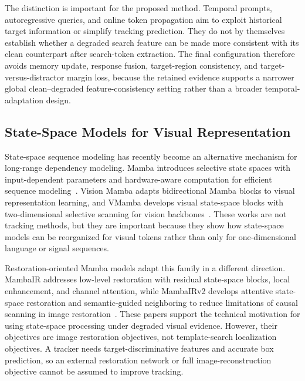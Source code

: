 The distinction is important for the proposed method. Temporal prompts, autoregressive queries, and online token propagation aim to exploit historical target information or simplify tracking prediction. They do not by themselves establish whether a degraded search feature can be made more consistent with its clean counterpart after search-token extraction. The final \method{} configuration therefore avoids memory update, response fusion, target-region consistency, and target-versus-distractor margin loss, because the retained evidence supports a narrower global clean--degraded feature-consistency setting rather than a broader temporal-adaptation design.

\subsection{State-Space Models for Visual Representation}
State-space sequence modeling has recently become an alternative mechanism for long-range dependency modeling. Mamba introduces selective state spaces with input-dependent parameters and hardware-aware computation for efficient sequence modeling~\cite{gu2024mamba}. Vision Mamba adapts bidirectional Mamba blocks to visual representation learning, and VMamba develops visual state-space blocks with two-dimensional selective scanning for vision backbones~\cite{zhu2024visionmamba,liu2024vmamba}. These works are not tracking methods, but they are important because they show how state-space models can be reorganized for visual tokens rather than only for one-dimensional language or signal sequences.

Restoration-oriented Mamba models adapt this family in a different direction. MambaIR addresses low-level restoration with residual state-space blocks, local enhancement, and channel attention, while MambaIRv2 develops attentive state-space restoration and semantic-guided neighboring to reduce limitations of causal scanning in image restoration~\cite{guo2024mambair,guo2025mambairv2}. These papers support the technical motivation for using state-space processing under degraded visual evidence. However, their objectives are image restoration objectives, not template-search localization objectives. A tracker needs target-discriminative features and accurate box prediction, so an external restoration network or full image-reconstruction objective cannot be assumed to improve tracking.

